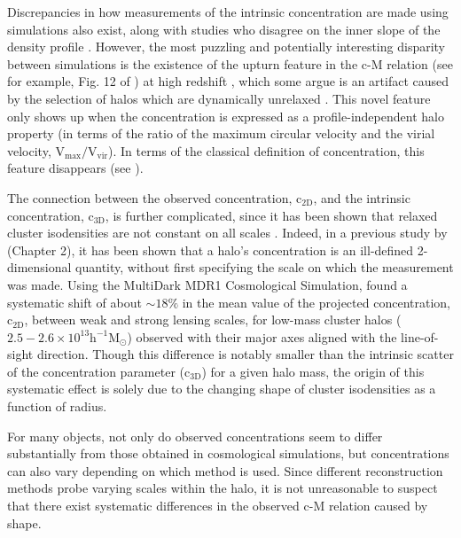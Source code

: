 Discrepancies in how measurements of the intrinsic concentration
are made using simulations also exist, along with studies who disagree
on the inner slope of the density profile
\citep{MO99.2,GH00.1,NA04.1}. However, the most puzzling and potentially
interesting disparity between simulations is the existence of the upturn
feature in the c-M relation (see for example, Fig. 12 of \citealt{PR12.1}) at high redshift
\citep{PR12.1,DU14.1,KL14.1,DI15.1}, which some argue is an artifact caused by
the selection of halos which are dynamically unrelaxed \citep{LU12.1}. This
novel feature only shows up when the concentration is expressed as a
profile-independent halo property (in terms of the ratio of the maximum 
circular velocity and the virial velocity, $\mathrm{V_{max}/V_{vir}}$). In
terms of the classical definition of concentration, this feature disappears
(see \citealt{ME13.1}). 

The connection between the observed concentration, $\mathrm{c_{2D}}$,
and the intrinsic concentration, $\mathrm{c_{3D}}$, is further complicated,
since it has been shown that relaxed cluster isodensities are not constant
on all scales \citep{FR88.1,CO96.1,DU91.1,WA92.1,JI02.1,HA07.1,GR14.1}. Indeed,
in a previous study by \citet{GR14.1} (Chapter 2), it has been shown that a halo's concentration
is an ill-defined 2-dimensional quantity, without first specifying the scale on which the
measurement was made. Using the MultiDark MDR1 Cosmological
Simulation, \citet{GR14.1} found a systematic shift of about $\mathrm{\sim 18 \%}$ in the
mean value of the projected concentration, $\mathrm{c_{2D}}$, between weak and
strong lensing scales, for low-mass cluster halos ($\mathrm{2.5-2.6 \times
  10^{13} h^{-1} M_{\odot}}$) observed with their major axes aligned with the
line-of-sight direction. Though this difference is notably smaller than the intrinsic
scatter of the concentration parameter ($\mathrm{c_{3D}}$) for a given halo
mass, the origin of this systematic effect is solely due to the changing shape
of cluster isodensities as a function of radius.


For many objects, not only do observed concentrations seem to differ
substantially from those obtained in cosmological simulations, but
concentrations can also vary depending on which method is used. Since different
reconstruction methods probe varying scales within the halo, it is 
not unreasonable to suspect that there exist systematic differences in the
observed c-M relation caused by shape.

\bigskip

